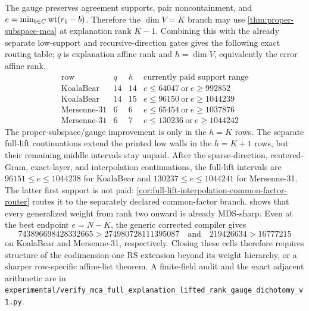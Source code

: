 \documentclass[11pt,a4paper]{amsart}
\numberwithin{equation}{section}
\theoremstyle{remark}
\begin{document}
\begin{remark}
\label{rem:full-explanation-top-rank-split}
The gauge preserves agreement supports, pair noncontainment, and
\(e=\min_{b\in C}\operatorname{wt}(r_1-b)\).  Therefore the \(\dim V=K\) branch may use
\cref{thm:proper-subspace-mca} at explanation rank \(K-1\).  Combining
this with the already separate low-support and recursive-direction gates
gives the following exact routing table; \(q\) is explanation affine rank
and \(h=\dim V\), equivalently the error affine rank.
\[
\begin{array}{c|c|c|c}
\text{row}&q&h&\text{currently paid support range}\\ \hline
\text{KoalaBear}&14&14&e\le64047\ \text{or}\ e\ge992852\\
\text{KoalaBear}&14&15&e\le96150\ \text{or}\ e\ge1044239\\
\text{Mersenne-31}&6&6&e\le65454\ \text{or}\ e\ge1037876\\
\text{Mersenne-31}&6&7&e\le130236\ \text{or}\ e\ge1044242
\end{array}
\]
The proper-subspace/gauge improvement is only in the \(h=K\) rows.  The
separate full-lift continuations extend the printed low walls in the
\(h=K+1\) rows, but their remaining middle intervals stay unpaid.
After the sparse-direction, centered-Gram, exact-layer, and interpolation
continuations, the full-lift intervals are
\(96151\le e\le1044238\) for KoalaBear and
\(130237\le e\le1044241\) for Mersenne-31.  The latter first support is
not paid: \cref{cor:full-lift-interpolation-common-factor-router} routes it
to the separately declared common-factor branch.
 shows that every generalized
weight from rank two onward is already MDS-sharp.  Even at the best endpoint
\(e=N-K\), the generic corrected compiler gives
\[
  743896698428332665>274980728111395087
  \quad\text{and}\quad
  219426634>16777215
\]
on KoalaBear and Mersenne-31, respectively.  Closing these cells therefore
requires structure of the codimension-one RS extension beyond its weight
hierarchy, or a sharper row-specific affine-list theorem.  A
finite-field audit and the exact adjacent arithmetic are in
\texttt{experimental/verify\_mca\_full\_explanation\_lifted\_rank\_gauge\_dichotomy\_v1.py}.
\end{remark}
\end{document}
